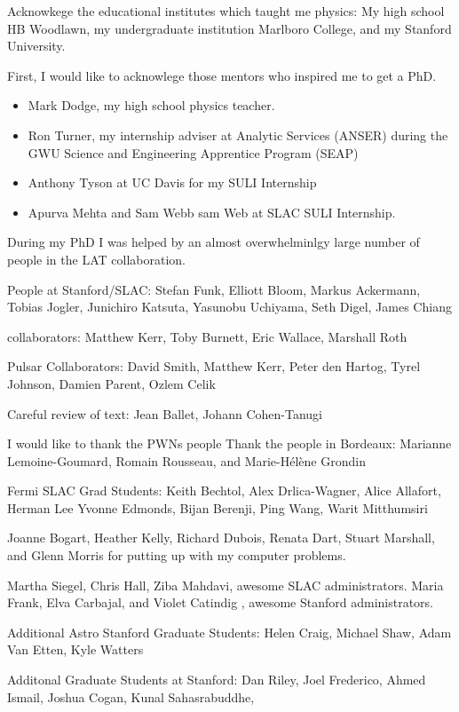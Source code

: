 



Acknowkege the educational institutes which taught me physics: My high school HB Woodlawn,
my undergraduate institution Marlboro College, and my Stanford University.

First, I would like to acknowlege those mentors who inspired me to get a PhD.
\begin{itemize}
  \item Mark Dodge, my high school physics teacher.
  \item Ron Turner, my internship adviser at Analytic Services (ANSER) during the 
  GWU Science and Engineering Apprentice Program (SEAP)
  \item Anthony Tyson at UC Davis for my SULI Internship
  \item Apurva Mehta and Sam Webb sam Web at SLAC SULI Internship.
\end{itemize}


During my PhD I was helped by an almost overwhelminlgy large 
number of people in the \gls{LAT} collaboration.

People at Stanford/SLAC: Stefan Funk, Elliott Bloom, 
Markus Ackermann, Tobias Jogler, Junichiro Katsuta, Yasunobu Uchiyama, Seth Digel, 
James Chiang

\pointlike collaborators: Matthew Kerr, Toby Burnett, Eric Wallace, Marshall Roth

Pulsar Collaborators: David Smith, Matthew Kerr, Peter den Hartog, Tyrel Johnson, Damien Parent, Ozlem Celik

Careful review of text: Jean Ballet, Johann Cohen-Tanugi

I would like to thank the \glspl{PWN} people
Thank the people in Bordeaux: Marianne Lemoine-Goumard, Romain Rousseau, and Marie-H\'el\`ene Grondin


Fermi SLAC Grad Students: Keith Bechtol, Alex Drlica-Wagner, Alice Allafort, Herman Lee
Yvonne Edmonds, Bijan Berenji, Ping Wang, Warit Mitthumsiri


Joanne Bogart, Heather Kelly, Richard Dubois, Renata Dart, Stuart Marshall, and Glenn Morris for putting up with my computer problems.

Martha Siegel, Chris Hall, Ziba Mahdavi, awesome SLAC administrators.
Maria Frank, Elva Carbajal, and Violet Catindig , awesome Stanford administrators.

Additional Astro Stanford Graduate Students: Helen Craig, Michael Shaw, Adam Van Etten, Kyle Watters

Additonal Graduate Students at Stanford: Dan Riley, Joel Frederico, Ahmed Ismail, Joshua Cogan, Kunal Sahasrabuddhe,
